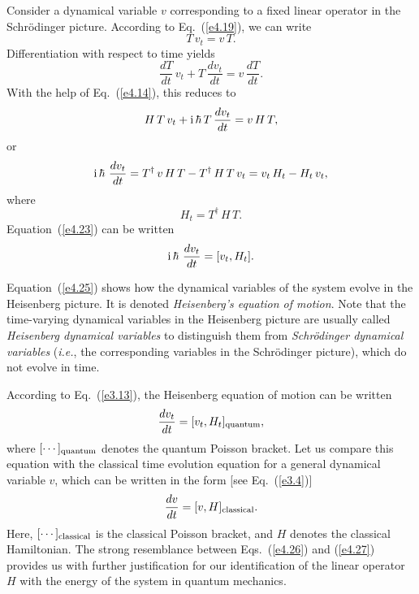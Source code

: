 Consider a dynamical variable $v$ corresponding to a fixed linear operator in
the Schr\"{o}dinger picture. According to Eq.~(\ref{e4.19}), we can write
\begin{equation}
T \,v_t = v\, T.
\end{equation}
Differentiation with respect to time yields
\begin{equation}
\frac{d T}{dt} \,v_t + T \,\frac{dv_t}{dt} = v\, \frac{dT}{dt}.
\end{equation}
With the help of Eq.~(\ref{e4.14}), this reduces to
\begin{equation}
H\,T\, v_t +{\rm i}\,\hbar\, T\,\frac{d v_t}{dt} = v\, H\,T,
\end{equation}
or
\begin{equation}\label{e4.23}
{\rm i}\,\hbar\ \frac{d v_t}{dt} = T^{\dag} \,v \,H\,T - T^{\dag} \,H\,T \,v_t
= v_t\, H_t - H_t\, v_t,
\end{equation}
where
\begin{equation}
H_t = T^{\dag}\, H\, T.
\end{equation}
Equation~(\ref{e4.23})
can be written
\begin{equation}\label{e4.25}
{\rm i}\,\hbar\ \frac{d v_t}{dt} = [v_t, H_t].
\end{equation}

Equation~(\ref{e4.25}) shows how the dynamical variables of the system evolve in the
Heisenberg  picture. It is denoted {\em Heisenberg's equation of motion}. 
Note that the time-varying dynamical variables in the Heisenberg picture
are usually called {\em Heisenberg dynamical variables} to distinguish them
from {\em Schr\"{o}dinger dynamical variables} ({\em i.e.}, the corresponding variables in
the Schr\"{o}dinger picture), which do not evolve in time. 

According to Eq.~(\ref{e3.13}), the Heisenberg equation of motion can be written
\begin{equation}\label{e4.26}
\frac{dv_t}{dt} = [v_t, H_t]_{\rm quantum},
\end{equation}
where $[\cdots]_{\rm quantum}$ denotes the quantum Poisson bracket. 
Let us compare this equation
with the classical time evolution
equation for a general dynamical variable $v$, which can be written
in the form [see Eq.~(\ref{e3.4})]
\begin{equation}\label{e4.27}
\frac{dv}{dt} = [v,H]_{\rm classical}.
\end{equation}
Here, $[\cdots]_{\rm classical}$ is the classical Poisson bracket, and $H$ denotes
the classical Hamiltonian. The strong resemblance between 
Eqs.~(\ref{e4.26}) and (\ref{e4.27}) 
provides us with further justification for our identification
of the linear operator $H$ with the energy of the system in quantum mechanics. 


